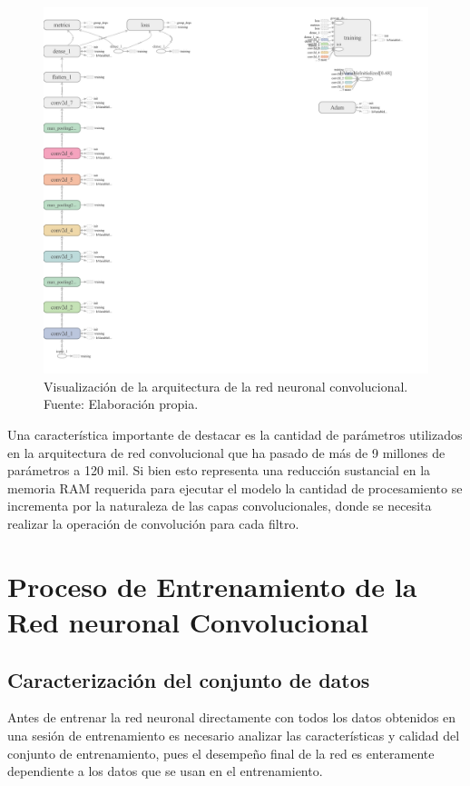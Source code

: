         \begin{figure}[!h] 
            \centering
            \includegraphics[width=\textwidth]{img/arqconv}
            \caption[Arquitectura de la red neuronal convolucional]{Visualización de la arquitectura de la red neuronal convolucional. Fuente: Elaboración propia. }
            \label{fig:arqconv}
        \end{figure}

        Una característica importante de destacar es la cantidad de parámetros utilizados en la arquitectura de red convolucional 
        que ha pasado de más de 9 millones de parámetros a 120 mil. Si bien esto representa una reducción sustancial en la 
        memoria RAM requerida para ejecutar el modelo la cantidad de procesamiento se incrementa por la naturaleza 
        de las capas convolucionales, donde se necesita realizar la operación de convolución para cada filtro.

\section{Proceso de Entrenamiento de la \\ Red neuronal Convolucional} \label{sec:training}

    \subsection{Caracterización del conjunto de datos}\label{sec:dataset}
    Antes de entrenar la red neuronal directamente con todos los datos obtenidos en una sesión de entrenamiento 
    es necesario analizar las características y calidad del conjunto de entrenamiento, pues el desempeño final de la 
    red es enteramente dependiente a los datos que se usan en el entrenamiento. 

